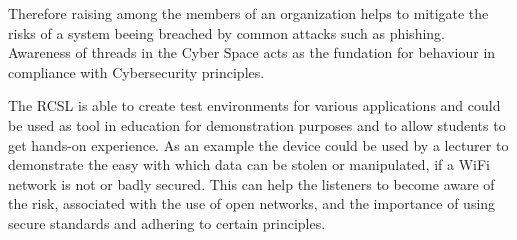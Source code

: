     Therefore raising among the members of an organization helps to mitigate the risks of a system beeing breached by common attacks such as phishing.
    Awareness of threads in the Cyber Space acts as the fundation for behaviour in compliance with Cybersecurity principles.

The RCSL is able to create test environments for various applications and could be used as tool in education for demonstration purposes and to allow students to get hands-on experience.
As an example the device could be used by a lecturer to demonstrate the easy with which data can be stolen or manipulated, if a WiFi network is not or badly secured.
This can help the listeners to become aware of the risk, associated with the use of open networks, and the importance of using secure standards and adhering to certain principles.

